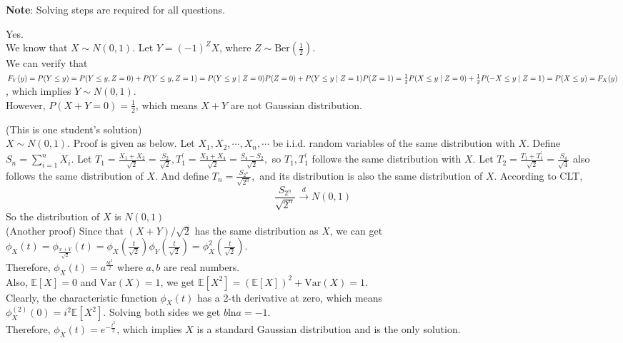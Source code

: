 \documentclass{homework}
\begin{document}
\maketitle
\textbf{Note}: Solving steps are required for all questions.

\question %
Yes. \\
We know that $X \sim N(0,1)$. Let $Y = (-1)^{Z}X$, where $Z \sim \mathrm{Ber}(\frac{1}{2})$.\\
We can verify that \\
$F_{Y}(y) = P(Y \leq y) = P(Y \leq y, Z=0) + P(Y \leq y, Z=1) \\
=P(Y \leq y \mid Z=0)P(Z=0)+P(Y \leq y \mid Z=1)P(Z=1) \\
=\frac{1}{2}P(X \leq y \mid Z=0)+\frac{1}{2}P(-X \leq y \mid Z=1) \\
=P(X \leq y) = F_{X}(y)$, which implies $Y \sim N(0,1)$.\\
However, $P(X+Y=0)=\frac{1}{2}$, which means $X+Y$ are not Gaussian distribution.

\question %
(This is one student's solution)\\
$X \sim N(0,1) .$ Proof is given as below.
Let $X_{1}, X_{2}, \cdots, X_{n}, \cdots$ be i.i.d. random variables of the same distribution with $X$.
Define $S_{n}=\sum_{i=1}^{n} X_{i} .$ Let $T_{1}=\frac{X_{1}+X_{2}}{\sqrt{2}}=\frac{S_{2}}{\sqrt{2}}, T_{1}^{\prime}=\frac{X_{3}+X_{4}}{\sqrt{2}}=\frac{S_{4}-S_{2}}{\sqrt{2}},$ so $T_{1}, T_{1}^{\prime}$ follows the same
distribution with $X$. Let $T_{2}=\frac{T_{1}+T_{1}^{\prime}}{\sqrt{2}}=\frac{S_{4}}{\sqrt{4}}$ also follows the same distribution of $X$. And define $T_{n}=\frac{S_{2^n}}{\sqrt{2^{n}}},$ and its distribution is also the same distribution of $X$.
According to CLT,
$$
\frac{S_{2^{n}}}{\sqrt{2^{n}}} \stackrel{d}{\longrightarrow} N(0,1)
$$
So the distribution of $X$ is $N(0,1)$\\

(Another proof) Since that $(X+Y)/\sqrt{2}$ has the same distribution as $X$, we can get \\
$\phi_{X}\left(t\right)=\phi_{\frac{x+Y}{\sqrt{2}}}(t)=\phi_{X}\left(\frac{t}{\sqrt{2}}\right) \phi_{Y}\left(\frac{t}{\sqrt{2}}\right)=\phi_{X}^{2}\left(\frac{t}{\sqrt{2}}\right)$.\\
Therefore, $\phi_{X}\left(t\right) = a^{\frac{bt^2}{2}}$ where $a, b$ are real numbers.\\
Also, $\mathbb{E}[X] = 0$ and $\mathrm{Var}(X)=1$, we get $\mathbb{E}[X^2]=(\mathbb{E}[X])^2+\mathrm{Var}(X)=1$.\\
Clearly, the characteristic function $\phi_{X}(t)$ has a 2-th derivative at zero, which means \\
$\phi_{X}^{(2)}(0)=i^2\mathbb{E}[X^2]$. Solving both sides we get $b\mathrm{ln}a=-1$.\\
Therefore, $\phi_{X}(t)=e^{-\frac{t^2}{2}}$, which implies $X$ is a standard Gaussian distribution and is the only solution.
\end{document}
